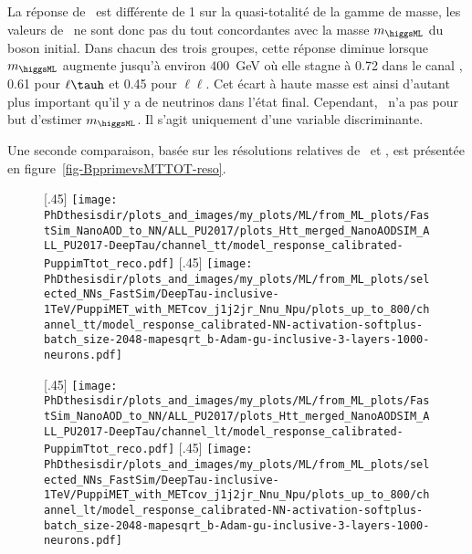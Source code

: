 La réponse de \mTtot\ est différente de 1 sur la quasi-totalité de la gamme de masse,
les valeurs de \mTtot\ ne sont donc pas du tout concordantes avec la masse $m_{\higgsML}$ du boson initial.
Dans chacun des trois groupes,
cette réponse diminue lorsque $m_{\higgsML}$ augmente jusqu'à environ \SI{400}{\GeV} où elle stagne
à \num{0.72} dans le canal \tauh\tauh,
\num{0.61} pour $\ell\tauh$
et
\num{0.45} pour $\ell\ell$.
Cet écart à haute masse est ainsi d'autant plus important qu'il y a de neutrinos dans l'état final.
Cependant, \mTtot\ n'a pas pour but d'estimer $m_{\higgsML}$.
Il s'agit uniquement d'une variable discriminante.
\par
Une seconde comparaison, basée sur les résolutions relatives de \mTtot\ et \mml, est présentée en figure~\ref{fig-BpprimevsMTTOT-reso}.
\begin{figure}[p]
\centering

[.45\textwidth]
{\texttt{[image: \\PhDthesisdir/plots\_and\_images/my\_plots/ML/from\_ML\_plots/FastSim\_NanoAOD\_to\_NN/ALL\_PU2017/plots\_Htt\_merged\_NanoAODSIM\_ALL\_PU2017-DeepTau/channel\_tt/model\_response\_calibrated-PuppimTtot\_reco.pdf]}\vspace{-.5\baselineskip}}
\hfill
{}[.45\textwidth]
{\texttt{[image: \\PhDthesisdir/plots\_and\_images/my\_plots/ML/from\_ML\_plots/selected\_NNs\_FastSim/DeepTau-inclusive-1TeV/PuppiMET\_with\_METcov\_j1j2jr\_Nnu\_Npu/plots\_up\_to\_800/channel\_tt/model\_response\_calibrated-NN-activation-softplus-batch\_size-2048-mapesqrt\_b-Adam-gu-inclusive-3-layers-1000-neurons.pdf]}\vspace{-.5\baselineskip}}

[.45\textwidth]
{\texttt{[image: \\PhDthesisdir/plots\_and\_images/my\_plots/ML/from\_ML\_plots/FastSim\_NanoAOD\_to\_NN/ALL\_PU2017/plots\_Htt\_merged\_NanoAODSIM\_ALL\_PU2017-DeepTau/channel\_lt/model\_response\_calibrated-PuppimTtot\_reco.pdf]}\vspace{-.5\baselineskip}}
\hfill
{}[.45\textwidth]
{\texttt{[image: \\PhDthesisdir/plots\_and\_images/my\_plots/ML/from\_ML\_plots/selected\_NNs\_FastSim/DeepTau-inclusive-1TeV/PuppiMET\_with\_METcov\_j1j2jr\_Nnu\_Npu/plots\_up\_to\_800/channel\_lt/model\_response\_calibrated-NN-activation-softplus-batch\_size-2048-mapesqrt\_b-Adam-gu-inclusive-3-layers-1000-neurons.pdf]}\vspace{-.5\baselineskip}}


\end{figure}
